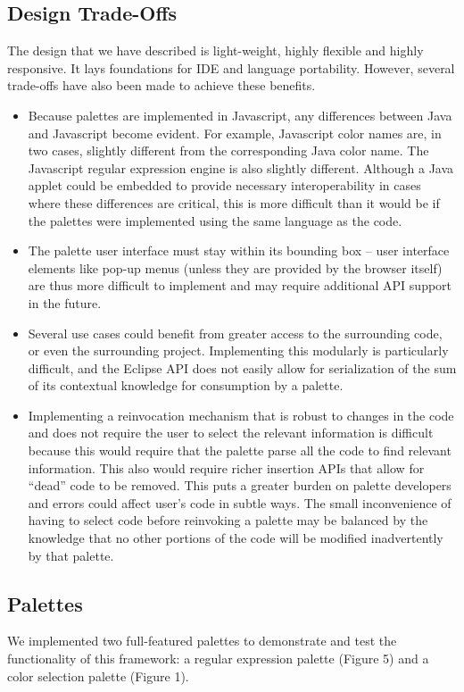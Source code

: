 \documentclass[10pt, conference, compsocconf]{IEEEtran}
\begin{document}
\subsection{Design Trade-Offs}
The design that we have described is light-weight, highly flexible and highly responsive. It lays foundations for IDE and language portability. However, several trade-offs have also been made to achieve these benefits.

\begin{itemize}
\item Because palettes are implemented in Javascript, any differences between Java and Javascript become evident. For example, Javascript color names are, in two cases, slightly different from the corresponding Java color name. The Javascript regular expression engine is also slightly different. Although a Java applet could be embedded to provide necessary interoperability in cases where these differences are critical, this is more difficult than it would be if the palettes were implemented using the same language as the code.
\item The palette user interface must stay within its bounding box -- user interface elements like pop-up menus (unless they are provided by the browser itself) are thus more difficult to implement and may require additional API support in the future.
\item Several use cases could benefit from greater access to the surrounding code, or even the surrounding project. Implementing this modularly is particularly difficult, and the Eclipse API does not easily allow for  serialization of the sum of its contextual knowledge for consumption by a palette.
\item Implementing a reinvocation mechanism that is robust to changes in the code and does not require the user to select the relevant information is difficult because this would require that the palette  parse all the code to find relevant information. This also would require richer insertion APIs that allow for  ``dead'' code to be removed. This puts a greater burden on palette developers and errors could affect user's code in subtle ways. The small inconvenience of having to select code before reinvoking a palette may be balanced by the knowledge that no other portions of the code will be modified inadvertently by that palette.
\end{itemize}

\subsection{Palettes}
We implemented two full-featured palettes to demonstrate and test the functionality of this framework: a regular expression palette (Figure 5) and a color selection palette (Figure 1).
\end{document}
